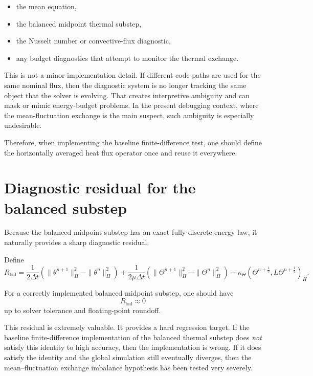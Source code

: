 \documentclass[11pt]{article}
\begin{document}
\begin{itemize}
\item the mean equation,
\item the balanced midpoint thermal substep,
\item the Nusselt number or convective-flux diagnostic,
\item any budget diagnostics that attempt to monitor the thermal exchange.
\end{itemize}

This is not a minor implementation detail. If different code paths are used for the same nominal flux, then the diagnostic system is no longer tracking the same object that the solver is evolving. That creates interpretive ambiguity and can mask or mimic energy-budget problems. In the present debugging context, where the mean-fluctuation exchange is the main suspect, such ambiguity is especially undesirable.

Therefore, when implementing the baseline finite-difference test, one should define the horizontally averaged heat flux operator once and reuse it everywhere.

\section{Diagnostic residual for the balanced substep}

Because the balanced midpoint substep has an exact fully discrete energy law, it naturally provides a sharp diagnostic residual.

Define
\begin{equation}
R_{\mathrm{bal}}
=
\frac{1}{2\Delta t}
\left(
\|\theta^{n+1}\|_H^2 - \|\theta^n\|_H^2
\right)
+
\frac{1}{2\mu\Delta t}
\left(
\|\Theta^{n+1}\|_H^2 - \|\Theta^n\|_H^2
\right)
-
\kappa_\Theta
(\Theta^{n+\frac12},L\Theta^{n+\frac12})_H.
\label{eq:Rbal}
\end{equation}

For a correctly implemented balanced midpoint substep, one should have
\[
R_{\mathrm{bal}} \approx 0
\]
up to solver tolerance and floating-point roundoff.

This residual is extremely valuable. It provides a hard regression target. If the baseline finite-difference implementation of the balanced thermal substep does \emph{not} satisfy this identity to high accuracy, then the implementation is wrong. If it does satisfy the identity and the global simulation still eventually diverges, then the mean--fluctuation exchange imbalance hypothesis has been tested very severely.
\end{document}
